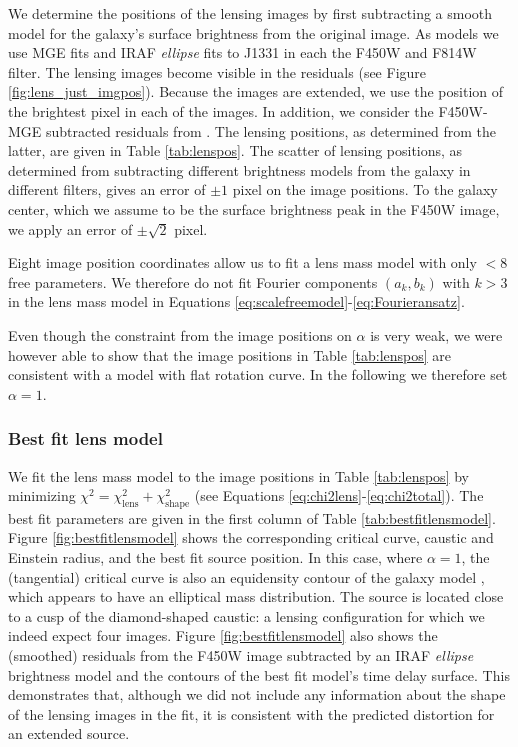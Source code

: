 \documentclass[useAMS,usenatbib]{mnras}
\begin{document}
We determine the positions of the lensing images by first subtracting a smooth model for the galaxy's surface brightness from the original image. As models we use MGE fits and IRAF \emph{ellipse} fits to J1331 in each the F450W and F814W filter. The lensing images become visible in the residuals (see Figure \ref{fig:lens_just_imgpos}). Because the images are extended, we use the position of the brightest pixel in each of the images. In addition, we consider the F450W-MGE subtracted residuals from \citet{SWELLSIII}. The lensing positions, as determined from the latter, are given in Table \ref{tab:lenspos}. The scatter of lensing positions, as determined from subtracting different brightness models from the galaxy in different filters, gives an error of $\pm 1$ pixel on the image positions. To the galaxy center, which we assume to be the surface brightness peak in the F450W image, we apply an error of $\pm \sqrt{2}$ pixel.

Eight image position coordinates allow us to fit a lens mass model with only $<8$ free parameters. We therefore do not fit Fourier components $(a_k,b_k)$ with $k > 3$ in the lens mass model in Equations \eqref{eq:scalefreemodel}-\eqref{eq:Fourieransatz}.

Even though the constraint from the image positions on $\alpha$ is very weak, we were however able to show that the image positions in Table \ref{tab:lenspos} are consistent with a model with flat rotation curve. In the following we therefore set $\alpha=1$.

\subsubsection{Best fit lens model} \label{sec:results_lensing_bestfit}

We fit the lens mass model to the image positions in Table \ref{tab:lenspos} by minimizing $\chi^2 = \chi_\text{lens}^2 + \chi_\text{shape}^2$ (see Equations \eqref{eq:chi2lens}-\eqref{eq:chi2total}). The best fit parameters are given in the first column of Table \ref{tab:bestfitlensmodel}. Figure \ref{fig:bestfitlensmodel} shows the corresponding critical curve, caustic and Einstein radius, and the best fit source position. In this case, where $\alpha=1$, the (tangential) critical curve is also an equidensity contour of the galaxy model \citep{EvansWitt}, which appears to have an elliptical mass distribution. The source is located close to a cusp of the diamond-shaped caustic: a lensing configuration for which we indeed expect four images. Figure \ref{fig:bestfitlensmodel} also shows the (smoothed) residuals from the F450W image subtracted by an IRAF \emph{ellipse} brightness model and the contours of the best fit model's time delay surface. This demonstrates that, although we did not include any information about the shape of the lensing images in the fit, it is consistent with the predicted distortion for an extended source.
\end{document}

